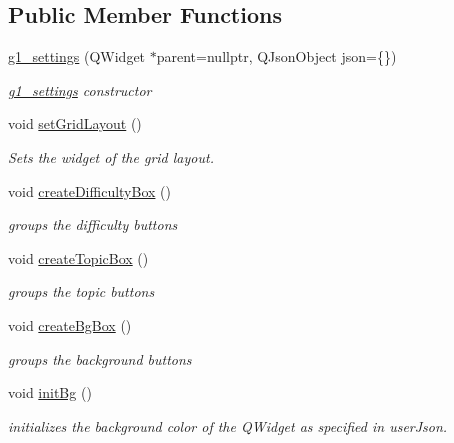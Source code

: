 \subsection*{Public Member Functions}
\begin{DoxyCompactItemize}
\item 
\hyperlink{classg1__settings_a0528bafcafa9832b59f045b59e1ab260}{g1\+\_\+settings} (Q\+Widget $\ast$parent=nullptr, Q\+Json\+Object json=\{\})
\begin{DoxyCompactList}\small\item\em \hyperlink{classg1__settings}{g1\+\_\+settings} constructor \end{DoxyCompactList}\item 
\mbox{\label{classg1__settings_af7571badf3ba81ae73f94fcdcbf00972}} 
void \hyperlink{classg1__settings_af7571badf3ba81ae73f94fcdcbf00972}{set\+Grid\+Layout} ()
\begin{DoxyCompactList}\small\item\em Sets the widget of the grid layout. \end{DoxyCompactList}\item 
\mbox{\label{classg1__settings_a5b1b70cf0a14c23ec8af63b1a68b6caf}} 
void \hyperlink{classg1__settings_a5b1b70cf0a14c23ec8af63b1a68b6caf}{create\+Difficulty\+Box} ()
\begin{DoxyCompactList}\small\item\em groups the difficulty buttons \end{DoxyCompactList}\item 
\mbox{\label{classg1__settings_aa99a57bac7a673e2bd59b739c35808f1}} 
void \hyperlink{classg1__settings_aa99a57bac7a673e2bd59b739c35808f1}{create\+Topic\+Box} ()
\begin{DoxyCompactList}\small\item\em groups the topic buttons \end{DoxyCompactList}\item 
\mbox{\label{classg1__settings_a1a024dbe1251bfabd6a4ff5691b4586e}} 
void \hyperlink{classg1__settings_a1a024dbe1251bfabd6a4ff5691b4586e}{create\+Bg\+Box} ()
\begin{DoxyCompactList}\small\item\em groups the background buttons \end{DoxyCompactList}\item 
\mbox{\label{classg1__settings_af75c3f57731ff8ced7e439328df3eddb}} 
void \hyperlink{classg1__settings_af75c3f57731ff8ced7e439328df3eddb}{init\+Bg} ()
\begin{DoxyCompactList}\small\item\em initializes the background color of the Q\+Widget as specified in user\+Json. \end{DoxyCompactList}\end{DoxyCompactItemize}
